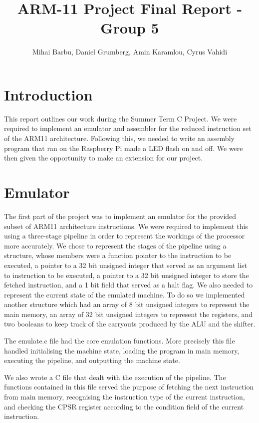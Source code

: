 \documentclass[11pt]{article}
\begin{document}
	
	\title{ARM-11 Project Final Report - Group 5}
	\author{Mihai Barbu, Daniel Grumberg, Amin Karamlou, Cyrus Vahidi}
	
	\maketitle
	
\section{Introduction}

This report outlines our work during the Summer Term C Project. We were required to implement an emulator and assembler for the reduced instruction set of the ARM11 architecture. Following this, we needed to write an assembly program that ran on the Raspberry Pi made a LED flash on and off. We were then given the opportunity to make an extension for our project.

\section{Emulator}

The first part of the project was to implement an emulator for the provided subset of ARM11 architecture instructions. We were required to implement this using a three-stage pipeline in order to represent the workings of the processor more accurately. We chose to represent the stages of the pipeline using a structure, whose members were a function pointer to the instruction to be executed, a pointer to a 32 bit unsigned integer that served as an argument list to instruction to be executed, a pointer to a 32 bit unsigned integer to store the fetched instruction, and a 1 bit field that served as a halt flag. We also needed to represent the current state of the emulated machine. To do so we implemented another structure which had an array of 8 bit unsigned integers to represent the main memory, an array of 32 bit unsigned integers to represent the registers, and two booleans to keep track of the carryouts produced by the ALU and the shifter.

The emulate.c file had the core emulation functions. More precisely this file handled initialising the machine state, loading the program in main memory, executing the pipeline, and outputting the machine state.

We also wrote a C file that dealt with the execution of the pipeline. The functions contained in this file served the purpose of fetching the next instruction from main memory, recognising the instruction type of the current instruction, and checking the CPSR register according to the condition field of the current instruction.
\end{document}
